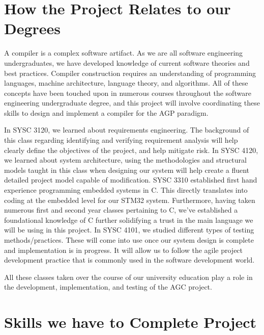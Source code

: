 \documentclass[11pt]{article}
\begin{document}
\section{How the Project Relates to our Degrees}

A compiler is a complex software artifact. As we are all software engineering undergraduates, we have developed knowledge of current software theories and best practices. Compiler construction requires an understanding of programming languages, machine architecture, language theory, and algorithms. All of these concepts have been touched upon in numerous courses throughout the software engineering undergraduate degree, and this project will involve coordinating these skills to design and implement a compiler for the AGP paradigm. 

In SYSC 3120, we learned about requirements engineering. The background of this class regarding identifying and verifying requirement analysis will help clearly define the objectives of the project, and help mitigate risk. In SYSC 4120, we learned about system architecture, using the methodologies and structural models taught in this class when designing our system will help create a fluent detailed project model capable of modification. SYSC 3310 established first hand experience programming embedded systems in C. This directly translates into coding at the embedded level for our STM32 system. Furthermore, having taken numerous first and second year classes pertaining to C, we’ve established a foundational knowledge of C further solidifying a trust in the  main language we will be using in this project. In SYSC 4101, we studied different types of testing methods/practices. These will come into use once our system design is complete and implementation is in progress. It will allow us to follow the agile project development practice that is commonly used in the software development world.

	All these classes taken over the course of our university education play a role in the development, implementation, and testing of the AGC project.

\section{Skills we have to Complete Project}
\end{document}
